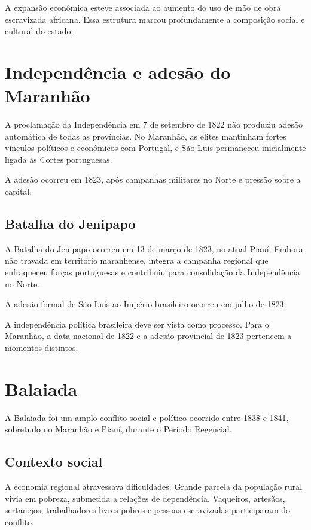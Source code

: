 A expansão econômica esteve associada ao aumento do uso de mão de obra escravizada africana. Essa estrutura marcou profundamente a composição social e cultural do estado.

\section{Independência e adesão do Maranhão}

A proclamação da Independência em 7 de setembro de 1822 não produziu adesão automática de todas as províncias. No Maranhão, as elites mantinham fortes vínculos políticos e econômicos com Portugal, e São Luís permaneceu inicialmente ligada às Cortes portuguesas.

A adesão ocorreu em 1823, após campanhas militares no Norte e pressão sobre a capital.

\subsection{Batalha do Jenipapo}

A Batalha do Jenipapo ocorreu em 13 de março de 1823, no atual Piauí. Embora não travada em território maranhense, integra a campanha regional que enfraqueceu forças portuguesas e contribuiu para consolidação da Independência no Norte.

A adesão formal de São Luís ao Império brasileiro ocorreu em julho de 1823.

\begin{atencao}
A independência política brasileira deve ser vista como processo. Para o Maranhão, a data nacional de 1822 e a adesão provincial de 1823 pertencem a momentos distintos.
\end{atencao}

\section{Balaiada}

A Balaiada foi um amplo conflito social e político ocorrido entre 1838 e 1841, sobretudo no Maranhão e Piauí, durante o Período Regencial.

\subsection{Contexto social}

A economia regional atravessava dificuldades. Grande parcela da população rural vivia em pobreza, submetida a relações de dependência. Vaqueiros, artesãos, sertanejos, trabalhadores livres pobres e pessoas escravizadas participaram do conflito.

